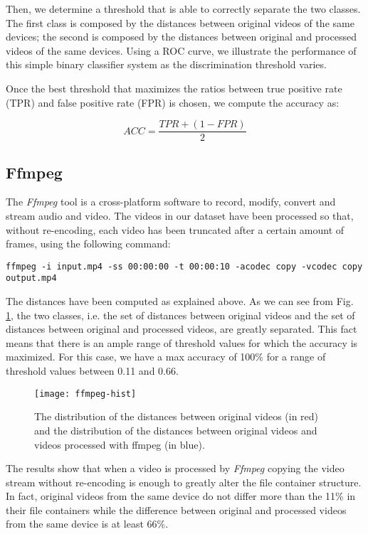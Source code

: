 Then, we determine a threshold that is able to correctly separate the two classes. The first class is composed by the distances between original videos of the same devices; the second is composed by the distances between original and processed videos of the same devices. Using a ROC curve, we illustrate the performance of this simple binary classifier system as the discrimination threshold varies.

Once the best threshold that maximizes the ratios between true positive rate (TPR) and false positive rate (FPR) is chosen, we compute the accuracy as:

\begin{equation}\label{eq:accuracy}
ACC = \dfrac{TPR + (1 - FPR)}{2}
\end{equation}

\subsection{Ffmpeg}

The \emph{Ffmpeg} tool is a cross-platform software to record, modify, convert and stream audio and video. The videos in our dataset have been processed so that, without re-encoding, each video has been truncated after a certain amount of frames, using the following command:

\begin{lstlisting}
ffmpeg -i input.mp4 -ss 00:00:00 -t 00:00:10 -acodec copy -vcodec copy output.mp4
\end{lstlisting}

The distances have been computed as explained above. As we can see from Fig. \ref{fig:ffmpeg-hist}, the two classes, i.e. the set of distances between original videos and the set of distances between original and processed videos, are greatly separated. This fact means that there is an ample range of threshold values for which the accuracy is maximized. For this case, we have a max accuracy of 100\% for a range of threshold values between 0.11 and 0.66.

\begin{figure}
  \centering
  \texttt{[image: ffmpeg-hist]}
  \caption{The distribution of the distances between original videos (in red) and the distribution of the distances between original videos and videos processed with ffmpeg (in blue).}\label{fig:ffmpeg-hist}
\end{figure}

The results show that when a video is processed by \emph{Ffmpeg} copying the video stream without re-encoding is enough to greatly alter the file container structure. In fact, original videos from the same device do not differ more than the 11\% in their file containers while the difference between original and processed videos from the same device is at least 66\%.

